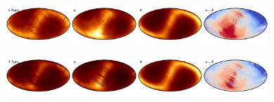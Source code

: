 \documentclass{aa}
\begin{document}
\begin{figure}
    \includegraphics[width=0.22\textwidth]{figs/zodi/zodi_04_tot.pdf}\includegraphics[width=0.22\textwidth]{figs/zodi/zodi_04_a.pdf}\includegraphics[width=0.22\textwidth]{figs/zodi/zodi_07_b.pdf}\includegraphics[width=0.22\textwidth]{figs/zodi/zodi_04_a-b.pdf}
    \vspace{-0.3cm}

    \includegraphics[width=0.22\textwidth]{figs/zodi/zodi_03_tot.pdf}\includegraphics[width=0.22\textwidth]{figs/zodi/zodi_03_a.pdf}\includegraphics[width=0.22\textwidth]{figs/zodi/zodi_08_b.pdf}\includegraphics[width=0.22\textwidth]{figs/zodi/zodi_03_a-b.pdf}
    \vspace{-0.3cm}


\end{figure}
\end{document}
